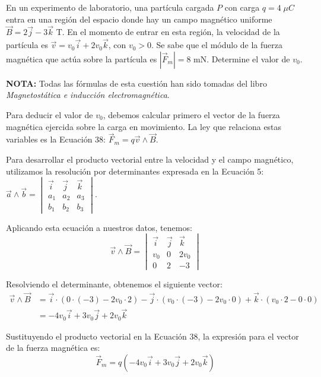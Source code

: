 \documentclass[11pt, a4paper]{article}
\newenvironment{problem}[1][Cuestión]{
	\vspace{0.5cm}
	\noindent{\Large\bfseries #1} \par\vspace{0.5cm}
}{
	\vspace{0.5cm}
}
\begin{document}
	\begin{problem}[Cuestión 1]
		En un experimento de laboratorio, una partícula cargada $P$ con carga $q = 4 \; \mu C$ entra en una región del espacio donde hay un campo magnético uniforme $\vec{B} = 2 \vec{j} - 3 \vec{k} \text{ T}$. En el momento de entrar en esta región, la velocidad de la partícula es $\vec{v} = v_0 \vec{i} + 2 v_0 \vec{k}$, con $v_0 > 0$. Se sabe que el módulo de la fuerza magnética que actúa sobre la partícula es $|\vec{F}_m| = 8 \text{ mN}$. Determine el valor de $v_0$.

		{ \color{blue} 
			\textbf{NOTA:} Todas las fórmulas de esta cuestión han sido tomadas del libro \textit{Magnetostática e inducción electromagnética}.
		}

		{ \color{blue} 
			Para deducir el valor de $v_0$, debemos calcular primero el vector de la fuerza magnética ejercida sobre la carga en movimiento. La ley que relaciona estas variables es la Ecuación 38: $\vec{F}_m = q\vec{v} \wedge \vec{B}$.

			Para desarrollar el producto vectorial entre la velocidad y el campo magnético, utilizamos la resolución por determinantes expresada en la Ecuación 5: $\vec{a} \wedge \vec{b} = \begin{vmatrix} \vec{i} & \vec{j} & \vec{k} \\ a_1 & a_2 & a_3 \\ b_1 & b_2 & b_3 \end{vmatrix}$.

			Aplicando esta ecuación a nuestros datos, tenemos:
			\begin{equation*}
				\vec{v} \wedge \vec{B} = 
				\begin{vmatrix}
					\vec{i} & \vec{j} & \vec{k} \\
					v_0 & 0 & 2v_0 \\
					0 & 2 & -3
				\end{vmatrix}
			\end{equation*}

			Resolviendo el determinante, obtenemos el siguiente vector:
			\begin{align*}
				\vec{v} \wedge \vec{B} &= \vec{i} \cdot (0 \cdot (-3) - 2v_0 \cdot 2) - \vec{j} \cdot (v_0 \cdot (-3) - 2v_0 \cdot 0) + \vec{k} \cdot (v_0 \cdot 2 - 0 \cdot 0) \\
				&= -4v_0\vec{i} + 3v_0\vec{j} + 2v_0\vec{k}
			\end{align*}

			Sustituyendo el producto vectorial en la Ecuación 38, la expresión para el vector de la fuerza magnética es:
			\begin{equation*}
				\vec{F}_m = q (-4v_0\vec{i} + 3v_0\vec{j} + 2v_0\vec{k})
			\end{equation*}

}
\end{problem}
\end{document}
